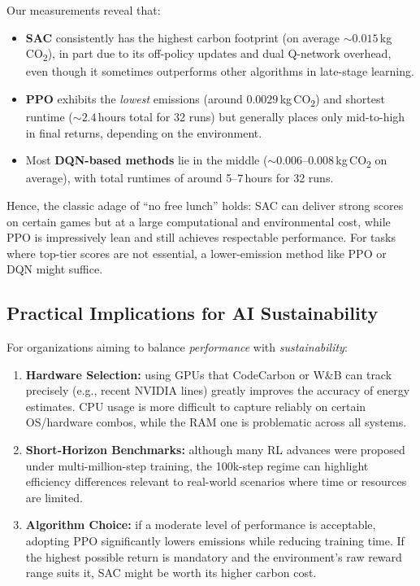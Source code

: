 Our measurements reveal that:
\begin{itemize}
	\item \textbf{SAC} consistently has the highest carbon footprint (on average $\sim 0.015$\,kg\,CO\textsubscript{2}), 
	in part due to its off-policy updates and dual Q-network overhead, 
	even though it sometimes outperforms other algorithms in late-stage learning.
	\item \textbf{PPO} exhibits the \emph{lowest} emissions (around $0.0029$\,kg\,CO\textsubscript{2}) 
	and shortest runtime ($\sim2.4$\,hours total for 32 runs) but generally places 
	only mid-to-high in final returns, depending on the environment.
	\item Most \textbf{DQN-based methods} lie in the middle 
	($\sim0.006$--$0.008$\,kg\,CO\textsubscript{2} on average), 
	with total runtimes of around 5--7\,hours for 32 runs.
\end{itemize}

Hence, the classic adage of “no free lunch” holds: SAC can deliver strong scores 
on certain games but at a large computational and environmental cost, 
while PPO is impressively lean and still achieves respectable performance. 
For tasks where top-tier scores are not essential, 
a lower-emission method like PPO or DQN might suffice.

\subsection{Practical Implications for AI Sustainability}
\label{subsec:practical_sustainability}
For organizations aiming to balance \emph{performance} with \emph{sustainability}:
\begin{enumerate}
	\item \textbf{Hardware Selection:} 
	using GPUs that CodeCarbon or W\&B can track precisely (e.g., recent NVIDIA lines) 
	greatly improves the accuracy of energy estimates. CPU usage is more difficult 
	to capture reliably on certain OS/hardware combos, while the RAM one is problematic across all systems.
	\item \textbf{Short-Horizon Benchmarks:} 
	although many RL advances were proposed under multi-million-step training, 
	the 100k-step regime can highlight efficiency differences relevant to 
	real-world scenarios where time or resources are limited.
	\item \textbf{Algorithm Choice:} 
	if a moderate level of performance is acceptable, adopting PPO
	significantly lowers emissions while reducing training time. 
	If the highest possible return is mandatory and the environment's raw reward range 
	suits it, SAC might be worth its higher carbon cost.
\end{enumerate}

